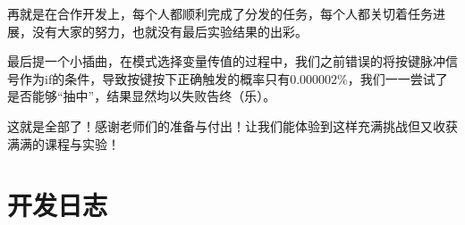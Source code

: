 	再就是在合作开发上，每个人都顺利完成了分发的任务，每个人都关切着任务进展，没有大家的努力，也就没有最后实验结果的出彩。
	
	最后提一个小插曲，在模式选择变量传值的过程中，我们之前错误的将按键脉冲信号作为if的条件，导致按键按下正确触发的概率只有$0.000002\%$，我们一一尝试了是否能够“抽中”，结果显然均以失败告终（乐）。
	
	这就是全部了！感谢老师们的准备与付出！让我们能体验到这样充满挑战但又收获满满的课程与实验！
	\appendix
%	
	\newpage
	\section{开发日志}
	
	\newpage



